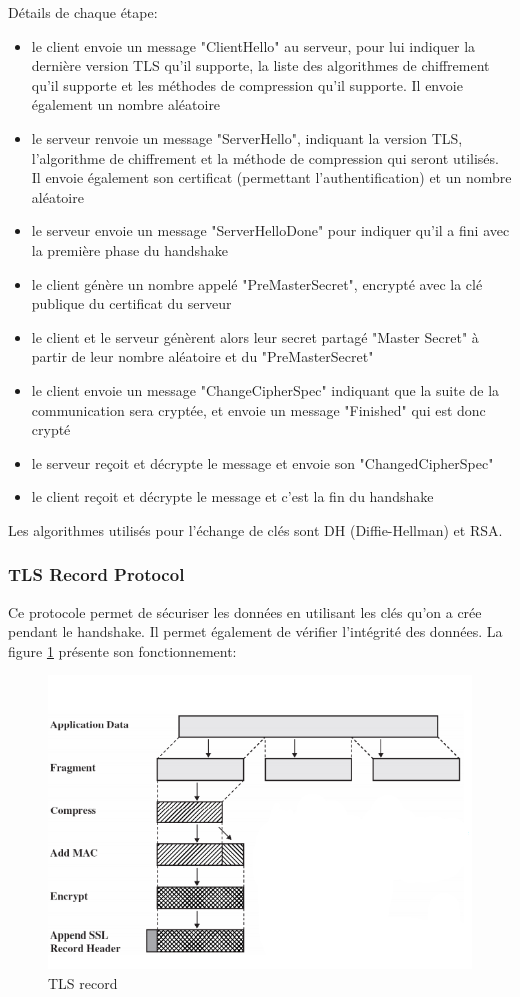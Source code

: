 Détails de chaque étape:
\begin{itemize}
\item le client envoie un message "ClientHello" au serveur, pour lui indiquer la dernière version TLS qu'il supporte, la liste des algorithmes de chiffrement qu'il supporte et les méthodes de compression qu'il supporte. Il envoie également un nombre aléatoire
\item le serveur renvoie un message "ServerHello", indiquant la version TLS, l'algorithme de chiffrement et la méthode de compression qui seront utilisés. Il envoie également son certificat (permettant l'authentification) et un nombre aléatoire
\item le serveur envoie un message "ServerHelloDone" pour indiquer qu'il a fini avec la première phase du handshake
\item le client génère un nombre appelé "PreMasterSecret", encrypté avec la clé publique du certificat du serveur
\item le client et le serveur génèrent alors leur secret partagé "Master Secret" à partir de leur nombre aléatoire et du "PreMasterSecret"
\item le client envoie un message "ChangeCipherSpec" indiquant que la suite de la communication sera cryptée, et envoie un message "Finished" qui est donc crypté
\item le serveur reçoit et décrypte le message et envoie son "ChangedCipherSpec"
\item le client reçoit et décrypte le message et c'est la fin du handshake
\end{itemize}
Les algorithmes utilisés pour l'échange de clés sont DH (Diffie-Hellman) et RSA. 

\subsubsection{TLS Record Protocol}

Ce protocole permet de sécuriser les données en utilisant les clés qu'on a crée pendant le handshake. Il permet également de vérifier l'intégrité des données. La figure \ref{record} présente son fonctionnement:
\begin{figure}[H]
\centering
\includegraphics[scale=0.7]{img/tls-record.png}
\caption{TLS record}
\label{record}
\end{figure}

